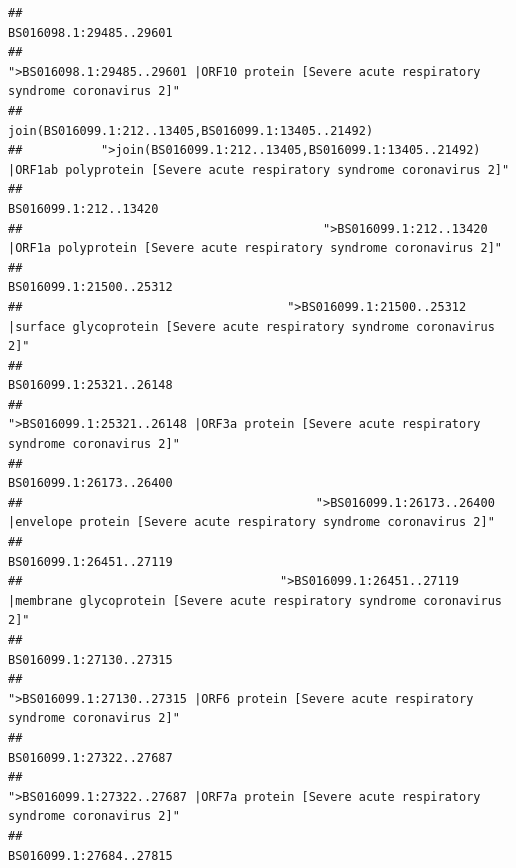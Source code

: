 \documentclass[
]{article}
\begin{document}
\begin{verbatim}
##                                                                                                                BS016098.1:29485..29601 
##                                            ">BS016098.1:29485..29601 |ORF10 protein [Severe acute respiratory syndrome coronavirus 2]" 
##                                                                                    join(BS016099.1:212..13405,BS016099.1:13405..21492) 
##           ">join(BS016099.1:212..13405,BS016099.1:13405..21492) |ORF1ab polyprotein [Severe acute respiratory syndrome coronavirus 2]" 
##                                                                                                                  BS016099.1:212..13420 
##                                          ">BS016099.1:212..13420 |ORF1a polyprotein [Severe acute respiratory syndrome coronavirus 2]" 
##                                                                                                                BS016099.1:21500..25312 
##                                     ">BS016099.1:21500..25312 |surface glycoprotein [Severe acute respiratory syndrome coronavirus 2]" 
##                                                                                                                BS016099.1:25321..26148 
##                                            ">BS016099.1:25321..26148 |ORF3a protein [Severe acute respiratory syndrome coronavirus 2]" 
##                                                                                                                BS016099.1:26173..26400 
##                                         ">BS016099.1:26173..26400 |envelope protein [Severe acute respiratory syndrome coronavirus 2]" 
##                                                                                                                BS016099.1:26451..27119 
##                                    ">BS016099.1:26451..27119 |membrane glycoprotein [Severe acute respiratory syndrome coronavirus 2]" 
##                                                                                                                BS016099.1:27130..27315 
##                                             ">BS016099.1:27130..27315 |ORF6 protein [Severe acute respiratory syndrome coronavirus 2]" 
##                                                                                                                BS016099.1:27322..27687 
##                                            ">BS016099.1:27322..27687 |ORF7a protein [Severe acute respiratory syndrome coronavirus 2]" 
##                                                                                                                BS016099.1:27684..27815 

\end{verbatim}
\end{document}
